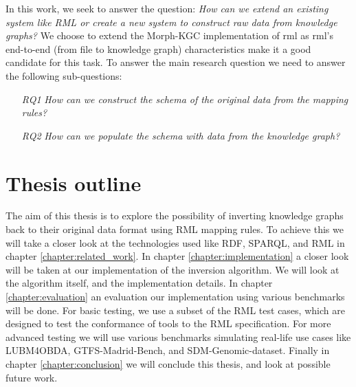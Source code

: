 In this work, we seek to answer the question: \textit{How can we extend an existing system like RML or create a new system to construct raw data from knowledge graphs?} We choose to extend the Morph-KGC implementation \citep{arenas2022morph} of \acrshort{rml} \citep{dimou_ldow_2014} as \acrshort{rml}'s end-to-end (from file to knowledge graph) characteristics make it a good candidate for this task. To answer the main research question we need to answer the following sub-questions:
\begin{itemize}
    \item[\textit{RQ1}] \textit{How can we construct the schema of the original data from the mapping rules?}
    \item[\textit{RQ2}] \textit{How can we populate the schema with data from the knowledge graph?}
\end{itemize}

\section{Thesis outline}
The aim of this thesis is to explore the possibility of inverting knowledge graphs back to their original data format using RML mapping rules. To achieve this we will take a closer look at the technologies used like RDF, SPARQL, and RML in chapter \ref{chapter:related_work}. %
In chapter \ref{chapter:implementation} a closer look will be taken at our implementation of the inversion algorithm. We will look at the algorithm itself, and the implementation details. 
In chapter \ref{chapter:evaluation} an evaluation our implementation using various benchmarks will be done. For basic testing, we use a subset of the RML test cases, which are designed to test the conformance of tools to the RML specification. For more advanced testing we will use various benchmarks simulating real-life use cases like LUBM4OBDA, GTFS-Madrid-Bench, and SDM-Genomic-dataset. Finally in chapter \ref{chapter:conclusion} we will conclude this thesis, and look at possible future work.
